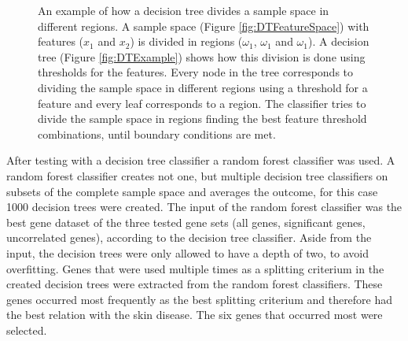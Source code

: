 \documentclass[10pt,a4paper]{report}
\begin{document}
	\begin{figure}[H]
		\centering
		\hfill
		\caption{An example of how a decision tree divides a sample space in different regions. A sample space (Figure \ref{fig:DTFeatureSpace}) with features ($x_1$ and $x_2$) is divided in regions ($\omega_1$, $\omega_1$ and $\omega_1$). A decision tree (Figure \ref{fig:DTExample}) shows how this division is done using thresholds for the features. Every node in the tree corresponds to dividing the sample space in different regions using a threshold for a feature and every leaf corresponds to a region. The classifier tries to divide the sample space in regions finding the best feature threshold combinations, until boundary conditions are met.}
		\label{fig:DecisionTree}
	\end{figure}
	
	After testing with a decision tree classifier a random forest classifier was used. A random forest classifier creates not one, but multiple decision tree classifiers on subsets of the complete sample space and averages the outcome, for this case 1000 decision trees were created. The input of the random forest classifier was the best gene dataset of the three tested gene sets (all genes, significant genes, uncorrelated genes), according to the decision tree classifier. Aside from the input, the decision trees were only allowed to have a depth of two, to avoid overfitting. Genes that were used multiple times as a splitting criterium in the created decision trees were extracted from the random forest classifiers. These genes occurred most frequently as the best splitting criterium and therefore had the best relation with the skin disease. The six genes that occurred most were selected.
	
\end{document}
